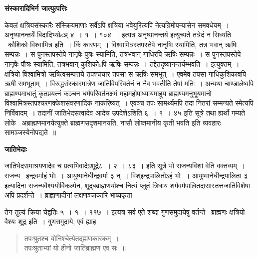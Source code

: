 \documentclass[11pt, openany]{book}
\begin{document}
\begin{center}
\textbf{\Large संस्कारादिभिर्न जात्युत्पत्तिः \textendash\ }
\end{center}

केवलं क्षत्रियसंस्कारैः संस्क्रियमाणाः सर्वेऽपि क्षत्रिया भवेयुरित्यपि नेत्यग्रिमोपन्यासेन समवधेयम्~। अनृष्यानन्तर्ये बिदादिभ्योsञ् ४~। १~। १०४~। इत्यत्र अनृष्यानन्तर्य इत्युच्यते तत्रेदं न सिध्यति \textendash\ कौशिको विश्वामित्र इति~। किं कारणम्~। विश्वामित्रस्तपस्तेपे नानृषिः स्यामिति, तत्र भवान् ऋषिः सम्पन्नः~। स पुनस्तपस्तेपे नानृषेः पुत्रः स्यामिति, तत्रभवान् गाधिरपि ऋषिः सम्पन्नः~। स पुनस्तपस्तेपे नानृषेः पौत्रः स्यामिति, तत्रभवान् कुशिकोsपि ऋषिः सम्पन्नः~। तद्देतदृष्यानन्तर्यम्भवति~। इत्युक्तम्~। क्षत्रियो विश्वामित्रो ऋषित्वसम्पत्तये तपश्चचार तपसा स ऋषिः समभूत्~। एवमेव तपसा गाधिकुशिकावपि ऋषी समभूताम्~। विरुद्धसंस्कारमात्रेण जातिविपरिवर्तनं न नैव भवतीति तेषां मतिः~। अन्यथा चाण्डालेष्वपि ब्राह्मण्यमाधातुं कृतप्रयत्नं कञ्चन धर्मपरिवर्तनक्षमं महामहोपाध्यायमाहूय ब्राह्मण्यमनुभूयमानो विश्वामित्रस्तपश्चरणक्केशसंवरणादिकं नाकरिष्यत्~। एवञ्च तपः सामर्थ्यमपि तदा नितरां सम्मन्यते स्मेत्यपि निर्विवादम्~। तदानीं जातिभेदसत्वादेव आदेच उपदेशेऽशिति ६~। १~। ४५ इति सूत्रे तथा ह्यर्थो गम्यते लोके \textendash\ अब्राह्मणमानयेत्युक्ते ब्राह्मणसदृशमानयति, नासौ लोष्तमानीय कृती भवति इति व्यवहारः सामञ्जस्येनोपद्यते~॥

\begin{center}
\textbf{\Large जातिभेदाः \textendash\ }
\end{center}

जातिभेदसमाश्रयणादेव च प्रत्यभिवादेऽशूद्रे८~। २~। ८३~। इति सूत्रे भो राजन्यविशां वेति वक्तव्यम्~। राजन्य \textendash\ इन्द्रवर्माहं भोः~। आयुष्मानेधीन्द्रवर्मा ३ न्~। विश्इन्द्रपालितोऽहं भोः~। आयुष्मानेधीन्द्रपालिता ३ इत्यादिना राजन्यवैश्ययोर्विकल्पेन, शूद्बब्राह्मणयोश्च नित्यं प्लुतं त्रिधाय शर्मवर्मपालितदासास्तत्तजातिविशेषा अपि प्रदर्शन्ते~। ब्राह्वाणादीनां लक्षणञ्चाकारि भाष्यकृता

\newpage

\noindent
तेन तुल्यं क्रिया चेद्वतिः ५~। १~। ११७~। इत्यत्र सर्व एते शब्दा गुणसमुदायेषु वर्तन्ते \textendash\ ब्राह्मणः क्षत्रियो वैश्यः शूद्र इति~। गुणसमुदाये, एवं ह्याह \textendash\

\begin{quote}
{\qt तपःश्रुतश्च योनिश्चेत्येतद्ह्मणकारकम्~।\\
तपःश्रुताभ्यां यो हीनो जातिब्राह्मण एव सः~॥}
\end{quote}
\end{document}
